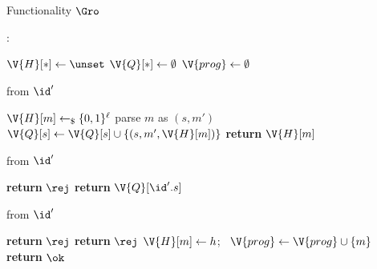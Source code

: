 \begin{interface}[nofloat]{Functionality $\Gro$ \\
}

{\scriptsize
\setlength{\columnsep}{1.4em}
\begin{multicols}{2}
:
\begin{algorithmic}[1]
\setcounter{contline}{0}\algcont
\State $\V{H}[*] \gets \unset$
\State $\V{Q}[*] \gets \emptyset$
\State $\V{prog} \gets \emptyset$
\algsave
\end{algorithmic}
\vspace{1.4ex}

 \quad from $\id'$
\begin{algorithmic}[1]
\algcont
{}
  \State $\V{H}[m] \gets_{\$} \{0,1\}^{\ell}$ \label{ln:roqdraw}
\EndIf
\State parse $m$ as $(s,m')$
 \label{ln:roillegit}
  \State $\V{Q}[s] \gets \V{Q}[s] \cup \{(s,m',\V{H}[m])\}$
\EndIf
\State \textbf{return} $\V{H}[m]$
\algsave
\end{algorithmic}
\vspace{1.4ex}

\columnbreak

 \quad from $\id'$
\begin{algorithmic}[1]
\algcont
{}
  \State \textbf{return} $\rej$ \label{ln:roobsadv}
\EndIf
\State \textbf{return} $\V{Q}[\id'.s]$ \label{ln:roobserve}
\algsave
\end{algorithmic}
\vspace{1.4ex}

 \quad from $\id'$
\begin{algorithmic}[1]
\algcont
{}
  \State \textbf{return} $\rej$
\EndIf
{}
  \State \textbf{return} $\rej$ \label{ln:ronoclobber}
\EndIf
\State $\V{H}[m] \gets h$; \ $\V{prog} \gets \V{prog} \cup \{m\}$
\State \textbf{return} $\ok$
\algsave
\end{algorithmic}
\vspace{1.4ex}


\end{multicols}}
\end{interface}
